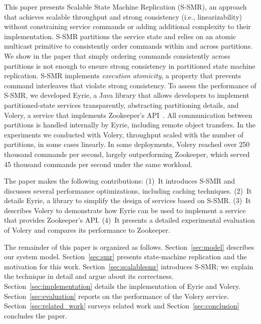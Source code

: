 This paper presents Scalable State Machine Replication (S-SMR), an approach that achieves scalable throughput and strong consistency (i.e., linearizability) without constraining service commands or adding additional complexity to their implementation.
%
S-SMR partitions the service state and relies on an atomic multicast primitive to consistently order commands within and across partitions.
We show in the paper that simply ordering commands consistently across partitions is not enough to ensure strong consistency in partitioned state machine replication.
S-SMR implements \emph{execution atomicity}, a property that prevents command interleaves that violate strong consistency. 
%
To assess the performance of S-SMR, we developed Eyrie, a Java library that allows developers to implement partitioned-state services transparently, abstracting partitioning details, and Volery, a service that implements Zookeeper's API~\cite{ZOO2010}. 
All communication between partitions is handled internally by Eyrie, including remote object transfers. 
In the experiments we conducted with Volery, throughput scaled with the number of partitions, in some cases linearly.
In some deployments, Volery reached over 250 thousand commands per second, largely outperforming Zookeeper, which served 45 thousand commands per second under the same workload.


The paper makes the following contributions: 
(1)~It introduces S-SMR and discusses several performance optimizations, including caching techniques.
(2)~It details Eyrie, a library to simplify the design of services based on S-SMR. 
(3)~It describes Volery to demonstrate how Eyrie can be used to implement a service that provides Zookeeper's API.
(4)~It presents a detailed experimental evaluation of Volery and compares its performance to Zookeeper.

The remainder of this paper is organized as follows.
Section~\ref{sec:model} describes our system model.
Section~\ref{sec:smr} presents state-machine replication and the motivation for this work.
Section~\ref{sec:scalablesmr} introduces S-SMR; we explain the technique in detail and argue about its correctness.
Section~\ref{sec:implementation} details the implementation of Eyrie and Volery.
Section~\ref{sec:evaluation} reports on the performance of the Volery service.
Section~\ref{sec:related_work} surveys related work and
Section~\ref{sec:conclusion} concludes the paper.

\clearpage